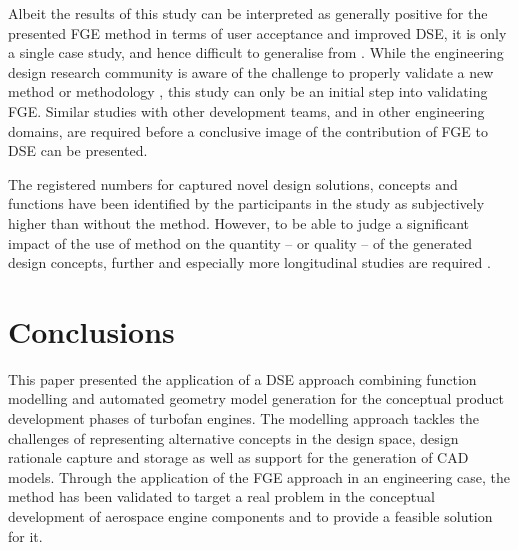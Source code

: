 \documentclass[aerospace,article,submit,moreauthors,pdftex]{Definitions/mdpi}
\newcommand{\Jakob}[1]{{{\color{orange}{\itshape{#1}}\color{black}}
    }{\ignorespaces}}
\begin{document}
Albeit the results of this study can be interpreted as generally positive for the presented \ac{FGE} method in terms of user acceptance and improved \ac{DSE}, it is only a single case study, and hence difficult to generalise from \citep{Blessing2002}.
While the engineering design research community is aware of the challenge to properly validate a new method or methodology \citep{Barth2011, Almefelt2006}, this study can only be an initial step into validating \ac{FGE}.
Similar studies with other development teams, and in other engineering domains, are required before a conclusive image of the contribution of \ac{FGE} to \ac{DSE} can be presented.

The registered numbers for captured novel design solutions, concepts and functions have been identified by the participants in the study as subjectively higher than without the method.
However, to be able to judge a significant impact of the use of method on the quantity -- or quality -- of the generated design concepts, further and especially more longitudinal studies are required \cite{Blessing2002}.



\section{Conclusions}\label{sec:conclusions}
This paper presented the application of a \ac{DSE} approach combining function modelling and automated geometry model generation for the conceptual product development phases of turbofan engines.
The modelling approach tackles the challenges of representing alternative concepts in the design space, design rationale capture and storage as well as support for the generation of \ac{CAD} models.
Through the application of the FGE approach in an engineering case, the method has been validated to target a real problem in the conceptual development of aerospace engine components and to provide a feasible solution for it.
\end{document}
